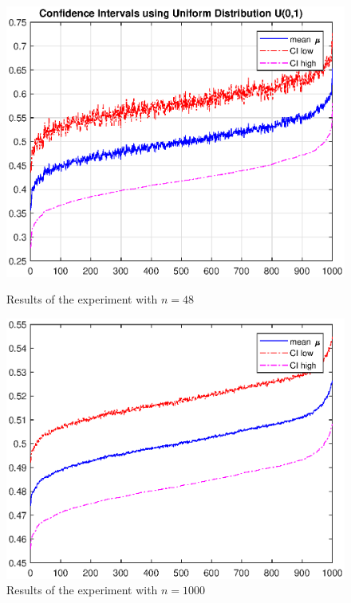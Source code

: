\documentclass[11pt,a4paper]{article}
\begin{document}
\section{}



\begin{figure}[ht]
	\centering
	\begin{minipage}{0.45\textwidth}
		\centering
		\includegraphics[width=\textwidth]{CI_48_2}
		\caption{Results of the experiment with $n=48$}
		\label{fig:CI_48_2}
	\end{minipage}
	\begin{minipage}{0.45\textwidth}
		\centering
		\includegraphics[width=\textwidth]{CI_10002}
		\caption{Results of the experiment with $n=1000$}
		\label{fig:CI_10002}
	\end{minipage}
\end{figure}
\end{document}
